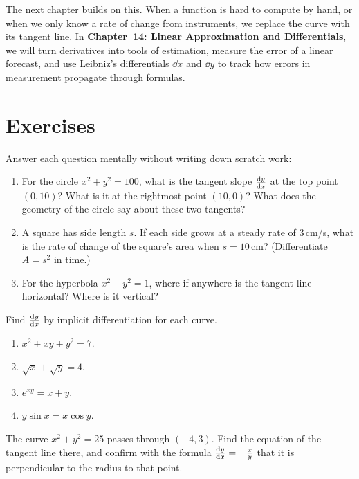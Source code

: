 The next chapter builds on this. When a function is hard to
compute by hand, or when we only know a rate of change from instruments,
we replace the curve with its tangent line. In \textbf{Chapter~14: Linear Approximation and Differentials},
we will turn derivatives into tools of estimation, measure the error of a linear forecast,
and use Leibniz's differentials $\dd x$ and $\dd y$ to track how errors in measurement propagate through
formulas.

\section{Exercises}
\label{ch13:exercises}

\begin{exercise}
Answer each question mentally without writing down scratch work:
\begin{enumerate}[label=(\alph*)]
\item For the circle $x^2 + y^2 = 100$, what is the tangent slope $\frac{\mathrm{d} y}{\mathrm{d} x}$ at the top point $(0,10)$? What is it at the rightmost point $(10,0)$? What does the geometry of the circle say about these two tangents?
\item A square has side length $s$. If each side grows at a steady rate of $3$\,cm/s, what is the rate of change of the square's area when $s = 10$\,cm? (Differentiate $A = s^2$ in time.)
\item For the hyperbola $x^2 - y^2 = 1$, where if anywhere is the tangent line horizontal? Where is it vertical?
\end{enumerate}
\end{exercise}

\begin{exercise}
Find $\frac{\mathrm{d} y}{\mathrm{d} x}$ by implicit differentiation for each curve.
\begin{enumerate}[label=(\alph*)]
\item $x^2 + xy + y^2 = 7$.
\item $\sqrt{x} + \sqrt{y} = 4$.
\item $e^{xy} = x + y$.
\item $y\sin x = x\cos y$.
\end{enumerate}
\end{exercise}

\begin{exercise}
The curve $x^2 + y^2 = 25$ passes through $(-4,3)$. Find the equation of the tangent line there, and
confirm with the formula $\frac{\mathrm{d} y}{\mathrm{d} x} = -\tfrac{x}{y}$ that it is perpendicular to the radius to that
point.
\end{exercise}


